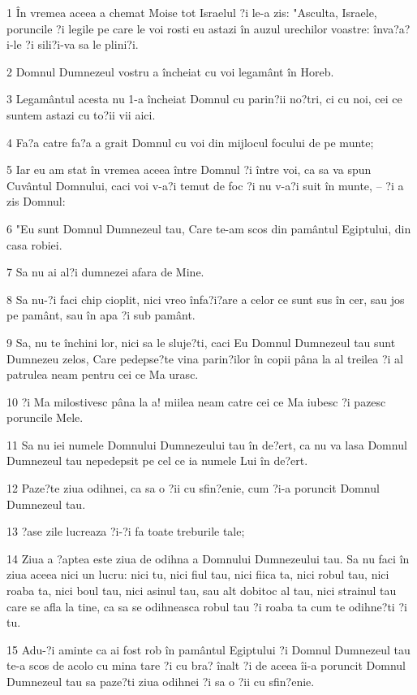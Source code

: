 \par 1 În vremea aceea a chemat Moise tot Israelul ?i le-a zis: "Asculta, Israele, poruncile ?i legile pe care le voi rosti eu astazi în auzul urechilor voastre: înva?a?i-le ?i sili?i-va sa le plini?i.
\par 2 Domnul Dumnezeul vostru a încheiat cu voi legamânt în Horeb.
\par 3 Legamântul acesta nu 1-a încheiat Domnul cu parin?ii no?tri, ci cu noi, cei ce suntem astazi cu to?ii vii aici.
\par 4 Fa?a catre fa?a a grait Domnul cu voi din mijlocul focului de pe munte;
\par 5 Iar eu am stat în vremea aceea între Domnul ?i între voi, ca sa va spun Cuvântul Domnului, caci voi v-a?i temut de foc ?i nu v-a?i suit în munte, -- ?i a zis Domnul:
\par 6 "Eu sunt Domnul Dumnezeul tau, Care te-am scos din pamântul Egiptului, din casa robiei.
\par 7 Sa nu ai al?i dumnezei afara de Mine.
\par 8 Sa nu-?i faci chip cioplit, nici vreo înfa?i?are a celor ce sunt sus în cer, sau jos pe pamânt, sau în apa ?i sub pamânt.
\par 9 Sa, nu te închini lor, nici sa le sluje?ti, caci Eu Domnul Dumnezeul tau sunt Dumnezeu zelos, Care pedepse?te vina parin?ilor în copii pâna la al treilea ?i al patrulea neam pentru cei ce Ma urasc.
\par 10 ?i Ma milostivesc pâna la a! miilea neam catre cei ce Ma iubesc ?i pazesc poruncile Mele.
\par 11 Sa nu iei numele Domnului Dumnezeului tau în de?ert, ca nu va lasa Domnul Dumnezeul tau nepedepsit pe cel ce ia numele Lui în de?ert.
\par 12 Paze?te ziua odihnei, ca sa o ?ii cu sfin?enie, cum ?i-a poruncit Domnul Dumnezeul tau.
\par 13 ?ase zile lucreaza ?i-?i fa toate treburile tale;
\par 14 Ziua a ?aptea este ziua de odihna a Domnului Dumnezeului tau. Sa nu faci în ziua aceea nici un lucru: nici tu, nici fiul tau, nici fiica ta, nici robul tau, nici roaba ta, nici boul tau, nici asinul tau, sau alt dobitoc al tau, nici strainul tau care se afla la tine, ca sa se odihneasca robul tau ?i roaba ta cum te odihne?ti ?i tu.
\par 15 Adu-?i aminte ca ai fost rob în pamântul Egiptului ?i Domnul Dumnezeul tau te-a scos de acolo cu mina tare ?i cu bra? înalt ?i de aceea îi-a poruncit Domnul Dumnezeul tau sa paze?ti ziua odihnei ?i sa o ?ii cu sfin?enie.
